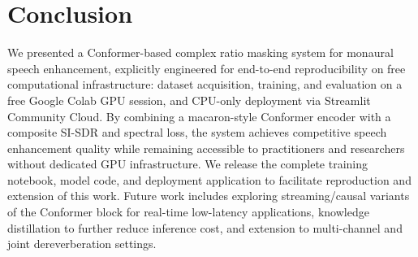 \documentclass[conference]{IEEEtran}
\begin{document}
\section{Conclusion}

We presented a Conformer-based complex ratio masking system for monaural speech
enhancement, explicitly engineered for end-to-end reproducibility on free computational
infrastructure: dataset acquisition, training, and evaluation on a free Google Colab GPU
session, and CPU-only deployment via Streamlit Community Cloud. By combining a macaron-style
Conformer encoder with a composite SI-SDR and spectral loss, the system achieves competitive
speech enhancement quality while remaining accessible to practitioners and researchers
without dedicated GPU infrastructure. We release the complete training notebook, model code,
and deployment application to facilitate reproduction and extension of this work. Future
work includes exploring streaming/causal variants of the Conformer block for real-time
low-latency applications, knowledge distillation to further reduce inference cost, and
extension to multi-channel and joint dereverberation settings.
\end{document}
